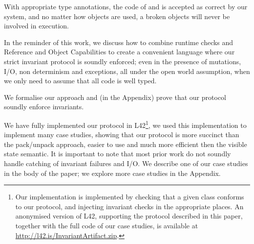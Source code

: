 With appropriate type annotations, the code of \Q@Range@ and \Q@BoxRange@ is accepted as correct by our system, and no matter how \Q@Range@ objects are used, a broken \Q@Range@ objects will never be involved in execution.

In the reminder of this work, we discuss how to combine runtime checks and Reference and Object Capabilities to create a convenient language where our strict invariant protocol is soundly enforced; even in the presence of mutations, I/O, non
determinism and exceptions, all under the open world assumption, when
we only need to assume that all code is well typed.

We formalise our approach and (in the Appendix) prove that our protocol soundly enforce invariants.

We have fully implemented our protocol in L42\footnote{
Our implementation is implemented by checking that a given class conforms to our protocol, and injecting invariant checks in the appropriate places.
An anonymised version of L42, supporting the protocol described in this paper, together with the full code of our case studies, is available at \url{http://l42.is/InvariantArtifact.zip}. %
}, we used this implementation to implement many case studies, showing that our protocol is more succinct than the pack/unpack approach, easier to use and much more efficient then the visible state semantic.
It is important to note that most prior work do not soundly handle catching of invariant failures and I/O.
We describe one of our case studies in the body of the paper; we explore more case studies in the Appendix.

